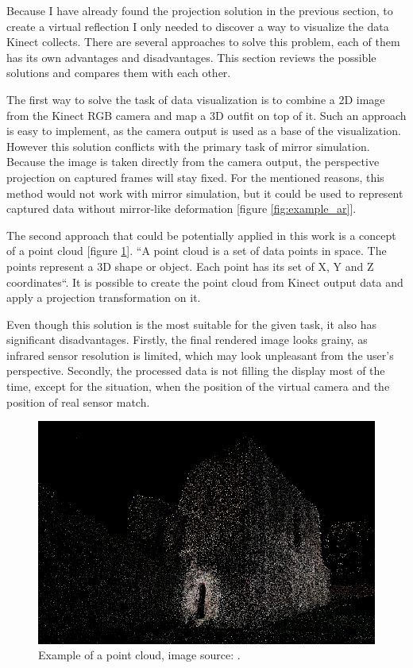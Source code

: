 \documentclass[a4paper]{report}
\begin{document}
\bigskip Because I have already found the projection solution in the previous section, to create a virtual reflection I only needed to discover a way to visualize the data Kinect collects. There are several approaches to solve this problem, each of them has its own advantages and disadvantages. This section reviews the possible solutions and compares them with each other.
	
 The first way to solve the task of data visualization is to combine a 2D image from the Kinect RGB camera and map a 3D outfit on top of it. Such an approach is easy to implement, as the camera output is used as a base of the visualization. However this solution conflicts with the primary task of mirror simulation. Because the image is taken directly from the camera output, the perspective projection on captured frames will stay fixed. For the mentioned reasons, this method would not work with mirror simulation, but it could be used to represent captured data without mirror-like deformation [figure \ref{fig:example_ar}].

 The second approach that could be potentially applied in this work is a concept of a point cloud [figure \ref{fig:example_pointcloud}].
“A point cloud is a set of data points in space. The points represent a 3D shape or object. Each point has its set of X, Y and Z coordinates“\cite{wikipediaPointCloud}. It is possible to create the point cloud from Kinect output data and apply a projection transformation on it.

 Even though this solution is the most suitable for the given task, it also has significant disadvantages. Firstly, the final rendered image looks grainy, as infrared sensor resolution is limited, which may look unpleasant from the user's perspective. Secondly, the processed data is not filling the display most of the time, except for the situation, when the position of the virtual camera and the position of real sensor match. 


\begin{figure}[H]
    \centering
    \includegraphics [width=\textwidth] {images/PointCloud.png}
    \caption{Example of a point cloud, image source: \cite{pointCLoud_image}.}
    \label{fig:example_pointcloud}
\end{figure}
\end{document}
